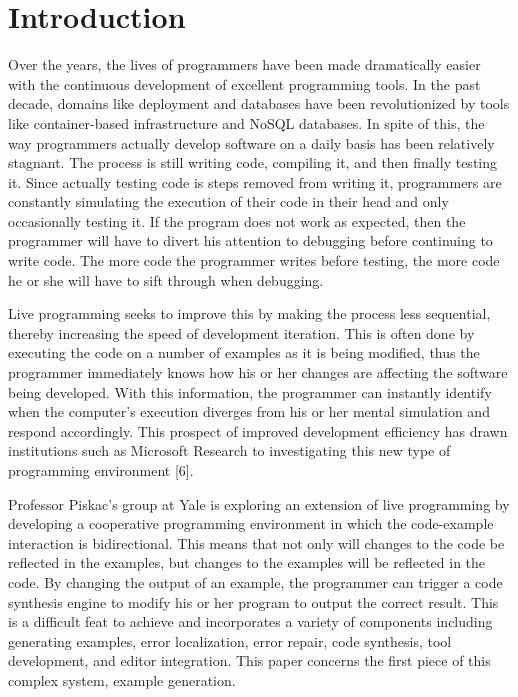 \section{Introduction}


Over the years, the lives of programmers have been made dramatically easier with the continuous development of excellent programming tools.
In the past decade, domains like deployment and databases have been revolutionized by tools like container-based infrastructure and NoSQL databases.
In spite of this, the way programmers actually develop software on a daily basis has been relatively stagnant.
The process is still writing code, compiling it, and then finally testing it.
Since actually testing code is steps removed from writing it, programmers are constantly simulating the execution of their code in their head and only occasionally testing it.
If the program does not work as expected, then the programmer will have to divert his attention to debugging before continuing to write code.
The more code the programmer writes before testing, the more code he or she will have to sift through when debugging.

Live programming seeks to improve this by making the process less sequential, thereby increasing the speed of development iteration.
This is often done by executing the code on a number of examples as it is being modified, thus the programmer immediately knows how his or her changes are affecting the software being developed.
With this information, the programmer can instantly identify when the computer's execution diverges from his or her mental simulation and respond accordingly.
This prospect of improved development efficiency has drawn institutions such as Microsoft Research to investigating this new type of programming environment [6].

Professor Piskac's group at Yale is exploring an extension of live programming by developing a cooperative programming environment in which the code-example interaction is bidirectional.
This means that not only will changes to the code be reflected in the examples, but changes to the examples will be reflected in the code.
By changing the output of an example, the programmer can trigger a code synthesis engine to modify his or her program to output the correct result.
This is a difficult feat to achieve and incorporates a variety of components including generating examples, error localization, error repair, code synthesis, tool development, and editor integration.
This paper concerns the first piece of this complex system, example generation.

